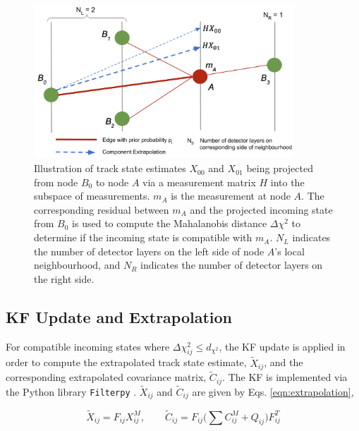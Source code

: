 \begin{figure}[htbp]
        \centering
        \includegraphics[width=0.87\textwidth]{images/5-gnn-algorithm/gnn-extrapolation.png}
        \caption{Illustration of track state estimates $X_{00}$ and $X_{01}$ being projected from node $B_0$ to node $A$ via a measurement matrix $H$ into the subspace of measurements. $m_A$ is the measurement at node $A$. The corresponding residual between $m_A$ and the projected incoming state from $B_0$ is used to compute the Mahalanobis distance $\Delta \chi^{2}$ to determine if the incoming state is compatible with $m_A$. $N_L$ indicates the number of detector layers on the left side of node $A$'s local neighbourhood, and $N_R$ indicates the number of detector layers on the right side.}
        \label{fig:extrapolation}%
\end{figure}


\subsection{KF Update and Extrapolation}
\label{chapter-5-kf-extrapolation}

For compatible incoming states where $\Delta \chi^{2}_{ij} \leq d_{\chi^{2}}$, the KF update is applied in order to compute the extrapolated track state estimate, $\tilde{X}_{ij}$, and the corresponding extrapolated covariance matrix, $\widetilde{C}_{ij}$. The KF is implemented via the Python library \texttt{Filterpy} \cite{filterpy}. $\tilde{X}_{ij}$ and $\widetilde{C}_{ij}$ are given by Eqs. \eqref{eqn:extrapolation},

\begin{equation}
\tilde{X}_{ij} = F_{ij} X_{ij}^{M}, \qquad \tilde{C}_{ij} = F_{ij} \biggl( \sum C_{ij}^{M} + Q_{ij} \biggl) F^{T}_{ij}
\label{eqn:extrapolation}
\end{equation}

